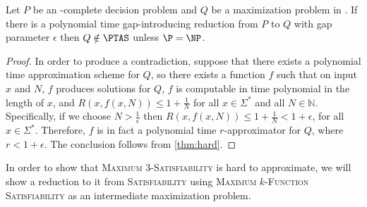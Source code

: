 \documentclass[]{article}
\begin{document}
\begin{corollary}\label{cor:notinptas}
  Let $P$ be an \NP-complete decision problem and $Q$ be a maximization problem in \NPO.
  If there is a polynomial time gap-introducing reduction from $P$ to $Q$ with gap parameter $\epsilon$ then $Q \notin \PTAS$ unless $\P = \NP$.
\end{corollary}
\begin{proof}
  In order to produce a contradiction, suppose that there exists a polynomial time approximation scheme for $Q$, so there exists a function $f$ such that on input $x$ and $N$, $f$ produces solutions for $Q$, $f$ is computable in time polynomial in the length of $x$, and $R(x, f(x, N)) \leq 1 + \frac{1}{N}$ for all $x \in \Sigma^*$ and all $N \in \mathbb{N}$.
  Specifically, if we choose $N > \frac{1}{\epsilon}$ then $R(x, f(x, N)) \leq 1 + \frac{1}{N} < 1 + \epsilon$, for all $x \in \Sigma^*$.
  Therefore, $f$ is in fact a polynomial time $r$-approximator for $Q$, where $r < 1 + \epsilon$.
  The conclusion follows from \autoref{thm:hard}.
\end{proof}

In order to show that \textsc{Maximum 3-Satisfiability} is hard to approximate, we will show a reduction to it from \textsc{Satisfiability} using \textsc{Maximum $k$-Function Satisfiability} as an intermediate maximization problem.
\end{document}
